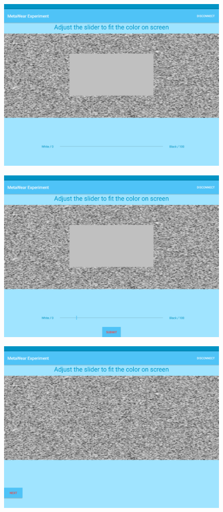\begin{figure}[h!]
    \centering
    \includegraphics[width=0.6\linewidth]{figures/tablet_screen7.png}
  \label{app_show_stim}
\end{figure}

\begin{figure}[h!]
    \centering
  \includegraphics[width=0.6\linewidth]{figures/tablet_screen8.png}
  \label{app_input_slider}
\end{figure}


\begin{figure}[h!]
    \centering
    \includegraphics[width=0.6\linewidth]{figures/tablet_screen9.png}
  \label{app_next_stim}
\end{figure}

